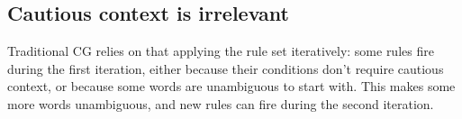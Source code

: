 \documentclass[11pt]{article}
\newcommand{\todo}[1]{{\color{cyan}\textbf{[TODO: }#1\textbf{]}}}
\begin{document}




\subsection{Cautious context is irrelevant}

Traditional CG relies on that applying the rule set iteratively:
some rules fire during the first iteration, either because their
conditions don't require cautious context, or because some words are
unambiguous to start with. This makes some more words unambiguous, and
new rules can fire during the second iteration.
\end{document}
